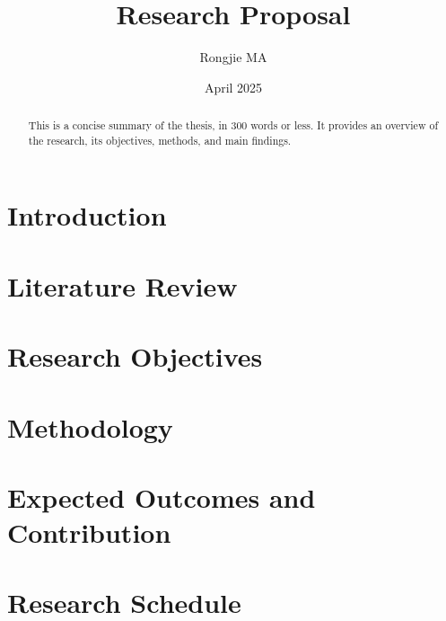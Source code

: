 \documentclass[12pt, oneside]{article}
\title{Research Proposal}
\author{Rongjie MA}
\date{April 2025}
\numberwithin{equation}{section}
\begin{document}
\maketitle

\begin{abstract}
This is a concise summary of the thesis, in 300 words or less. It provides an overview of the research, its objectives, methods, and main findings.
\end{abstract}

\section{Introduction}

\section{Literature Review}

\section{Research Objectives}

\section{Methodology}

\section{Expected Outcomes and Contribution}

\section{Research Schedule}
\end{document}
